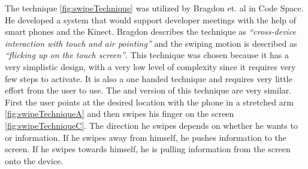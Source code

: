 \begin{figure}[H]
	\label{fig:grabTechnique}
\end{figure}

The \swipe technique \cref{fig:swipeTechnique} was utilized by Bragdon et. al  in Code Space.
He developed a system that would support developer meetings with the help of smart phones and the Kinect. Bragdon describes the technique as \emph{``cross-device interaction with touch and air pointing''} and the swiping motion is described as \emph{``flicking up on the touch screen''}.
This technique was chosen because it has a very simplistic design, with a very low level of complexity since it requires very few steps to activate.
It is also a one handed technique and requires very little effort from the user to use.
The \push and \pull version of this technique are very similar.
First the user points at the desired location with the phone in a stretched arm \cref{fig:swipeTechniqueA} and then swipes his finger on the screen \cref{fig:swipeTechniqueC}.
The direction he swipes depends on whether he wants to \push or \pull information.
If he swipes away from himself, he pushes information to the screen.
If he swipes towards himself, he is pulling information from the screen onto the device.  

